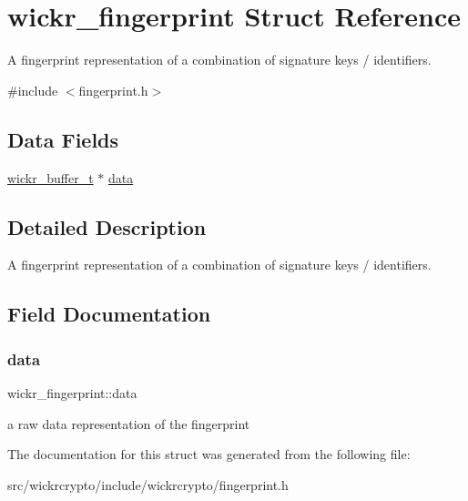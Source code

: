 \hypertarget{structwickr__fingerprint}{}\section{wickr\+\_\+fingerprint Struct Reference}
\label{structwickr__fingerprint}


A fingerprint representation of a combination of signature keys / identifiers.  




{\ttfamily \#include $<$fingerprint.\+h$>$}

\subsection*{Data Fields}
\begin{DoxyCompactItemize}
\item 
\mbox{\hyperlink{structwickr__buffer}{wickr\+\_\+buffer\+\_\+t}} $\ast$ \mbox{\hyperlink{structwickr__fingerprint_a56e7c92e7c9ab8a8c0d6f6f7960eef74}{data}}
\end{DoxyCompactItemize}


\subsection{Detailed Description}
A fingerprint representation of a combination of signature keys / identifiers. 

\subsection{Field Documentation}
\mbox{\label{structwickr__fingerprint_a56e7c92e7c9ab8a8c0d6f6f7960eef74}} 
\subsubsection{\texorpdfstring{data}{data}}
{\footnotesize\ttfamily wickr\+\_\+fingerprint\+::data}

a raw data representation of the fingerprint 

The documentation for this struct was generated from the following file\+:\begin{DoxyCompactItemize}
\item 
src/wickrcrypto/include/wickrcrypto/fingerprint.\+h\end{DoxyCompactItemize}
